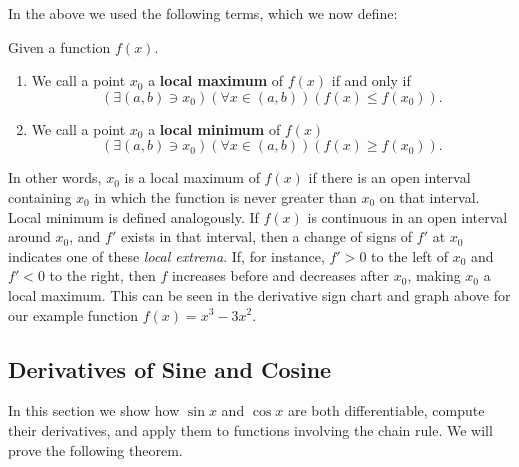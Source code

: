 In the above we used the following terms, which we now
define:
\begin{definition}Given a function $f(x)$.
\begin{enumerate}
\item We call a point $x_0$ a {\bf local maximum} of $f(x)$
      if and only if 
\begin{equation}(\exists(a,b)\ni x_0)(\forall x\in (a,b))(f(x)\le f(x_0)).
\end{equation}
\item We call a point $x_0$ a {\bf local minimum} of $f(x)$
\begin{equation}(\exists(a,b)\ni x_0)(\forall x\in (a,b))(f(x)\ge f(x_0)).
\end{equation}
\end{enumerate}
\end{definition}
In other words, $x_0$ is a local maximum of $f(x)$ if there
is an open interval containing $x_0$ in which the function
is never greater than $x_0$ on that interval.  Local
minimum is defined analogously.  If $f(x)$
is continuous in an open interval around $x_0$, and
$f'$ exists in that interval, then a change of signs
of $f'$ at $x_0$ indicates one of these {\it local extrema}.
If, for instance, $f'>0$ to the left of $x_0$ and $f'<0$
to the right, then $f$ increases before and decreases after $x_0$,
making $x_0$ a local maximum.  This can be seen in the 
derivative sign chart and graph above for our example function
$f(x)=x^3-3x^2$.
\subsection{Derivatives of Sine and Cosine}
In this section we show how $\sin x$ and $\cos x$ are
both differentiable, compute their derivatives, and apply
them to functions involving the chain rule.
We will prove the following theorem.

